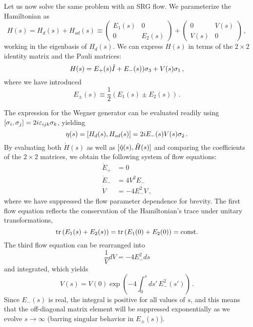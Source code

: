 Let us now solve the same problem with an SRG flow. We parameterize the Hamiltonian
as
\begin{equation}
  H(s) = H_d(s) + H_{od}(s) \equiv \begin{pmatrix}E_1(s) & 0 \\ 0 & E_2(s)\end{pmatrix} + 
         \begin{pmatrix} 0 & V(s) \\ V(s) & 0\end{pmatrix}\,,
\end{equation}
working in the eigenbasis of $H_d(s)$. We can express $H(s)$ in terms of the $2\times2$ 
identity matrix and the Pauli matrices:
\begin{equation}
  H(s) = E_{+}(s) \hat{I} + E_{-}(s))\sigma_3 
         + V(s)\sigma_1\,,
\end{equation}
where we have introduced
\begin{equation}
  E_{\pm}(s) \equiv \frac{1}{2}\left(E_1(s) \pm E_2(s)\right)\,.
\end{equation}

The expression for the Wegner generator can be evaluated readily using 
$[{\sigma_i},{\sigma_j}]=2i\varepsilon_{ijk}\sigma_k$, yielding
\begin{equation}
  \eta(s) = [{H_d(s)},{H_{od}(s)}] = 2 i E_{-}(s) V(s) \sigma_2\,.
\end{equation}
By evaluating both $\dot{H}(s)$ as well as $[{\hat{\eta}(s)},{\hat{H}(s)}]$
and comparing the coefficients of the $2\times2$ matrices, we obtain the
following system of flow equations:
\begin{align}
  \dot{E}_+ & = 0 \label{eq:flow_Eplus}\\
  \dot{E}_{-} &= 4 V^2 E_{-} \label{eq:flow_Eminus}\\
  \dot{V}     &= -4 E_{-}^2V \label{eq:flow_V}\,,
\end{align}
where we have suppressed the flow parameter dependence for brevity.
The first flow equation reflects the conservation of the Hamiltonian's
trace under unitary transformations,
\begin{equation}
  \mathrm{tr}\, (E_1(s) + E_2(s)) = \mathrm{tr}\, (E_1(0) + E_2(0)) = \text{const.}
\end{equation} 
The third flow equation can be rearranged into
\begin{equation}
  \frac{1}{V}dV = - 4 E_{-}^2 ds
\end{equation}
and integrated, which yields
\begin{equation}
  V(s) = V(0)\exp\left(-4\int_0^sds'\,E^2_{-}(s') \right)\,.
\end{equation}
Since $E_{-}(s)$ is real, the integral is positive for all values
of $s$, and this means that the off-diagonal matrix element will 
be suppressed exponentially as we evolve $s\to\infty$ (barring
singular behavior in $E_{\pm}(s)$).

